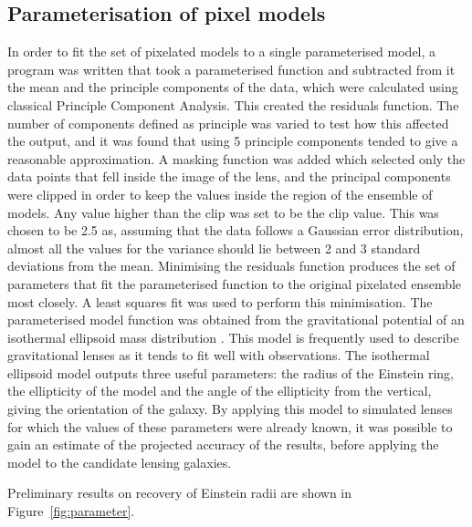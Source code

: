 \documentclass[fleqn,usenatbib]{mnras}
\begin{document}
\subsection{Parameterisation of pixel models} \label{subsec:parameter}
In order to fit the set of pixelated models to a single parameterised model, a program was written that took a parameterised function and subtracted from it the mean and the principle components of the data, which were calculated using classical Principle Component Analysis.
This created the residuals function.
The number of components defined as principle was varied to test how this affected the output, and it was found that using 5 principle components tended to give a reasonable approximation.
A masking function was added which selected only the data points that fell inside the image of the lens, and the principal components were clipped in order to keep the values inside the region of the ensemble of models.
Any value higher than the clip was set to be the clip value.
This was chosen to be 2.5 as, assuming that the data follows a Gaussian error distribution, almost all the values for the variance should lie between 2 and 3 standard deviations from the mean.
Minimising the residuals function produces the set of parameters that fit the parameterised function to the original pixelated ensemble most closely.
A least squares fit was used to perform this minimisation.
The parameterised model function was obtained from the gravitational potential of an isothermal ellipsoid mass distribution \cite{2001astro.ph..2341K}.
This model is frequently used to describe gravitational lenses as it tends to fit well with observations.
The isothermal ellipsoid model outputs three useful parameters: the radius of the Einstein ring, the ellipticity of the model and the angle of the ellipticity from the vertical, giving the orientation of the galaxy.
By applying this model to simulated lenses for which the values of these parameters were already known, it was possible to gain an estimate of the projected accuracy of the results, before applying the model to the candidate lensing galaxies.

Preliminary results on recovery of Einstein radii are shown in
Figure~\ref{fig:parameter}. 
\end{document}
